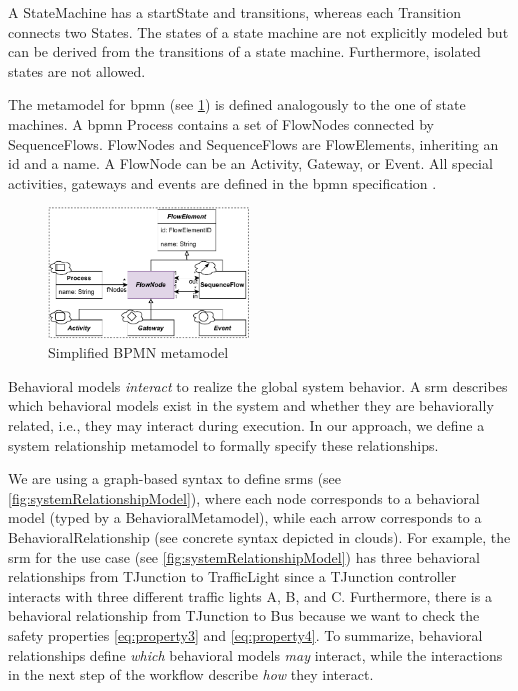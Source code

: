 \documentclass{jot}
\begin{document}
A \textsf{StateMachine} has a \textsf{startState} and \textsf{transitions}, whereas each \textsf{Transition} connects two \textsf{State}s.
The states of a state machine are not explicitly modeled but can be derived from the transitions of a state machine.
Furthermore, isolated states are not allowed.

The metamodel for \gls*{bpmn} (see \cref{fig:bpmn_metamodel}) is defined analogously to the one of state machines. 
A \gls*{bpmn} \textsf{Process} contains a set of \textsf{FlowNode}s connected by \textsf{SequenceFlow}s.
\textsf{FlowNode}s and \textsf{SequenceFlow}s are \textsf{FlowElement}s, inheriting an \textsf{id} and a \textsf{name}.
A \textsf{FlowNode} can be an \textsf{Activity}, \textsf{Gateway}, or \textsf{Event}.
All special activities, gateways and events are defined in the \gls*{bpmn} specification \cite{objectmanagementgroupBusinessProcessModel2013}. %

\begin{figure}[h]
    \centering
    \includegraphics[width=0.475\textwidth]{figures/bpmn_metamodel.pdf}
    \caption{Simplified BPMN metamodel \cite{objectmanagementgroupBusinessProcessModel2013}}
    \label{fig:bpmn_metamodel}
\end{figure}

Behavioral models \emph{interact} to realize the global system behavior.
A \gls*{srm} describes which behavioral models exist in the system and whether they are behaviorally related, i.e., they may interact during execution.
In our approach, we define a system relationship metamodel to formally specify these relationships.

We are using a graph-based syntax to define \gls*{srm}s (see \cref{fig:systemRelationshipModel}), where each node corresponds to a behavioral model (typed by a \textsf{BehavioralMetamodel}), while each arrow corresponds to a \textsf{BehavioralRelationship} (see concrete syntax depicted in clouds).
For example, the \gls*{srm} for the use case (see \cref{fig:systemRelationshipModel}) has three behavioral relationships from \textsf{TJunction} to \textsf{TrafficLight} since a TJunction controller interacts with three different traffic lights A, B, and C.
Furthermore, there is a behavioral relationship from \textsf{TJunction} to \textsf{Bus} because we want to check the safety properties \eqref{eq:property3} and \eqref{eq:property4}. 
To summarize, behavioral relationships define \emph{which} behavioral models \emph{may} interact, while the interactions in the next step of the workflow describe \emph{how} they interact.
\end{document}
